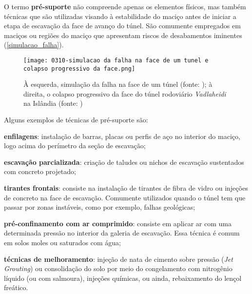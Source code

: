O termo \textbf{pré-suporte} não compreende apenas os elementos físicos, mas também técnicas que são utilizadas visando à estabilidade do maciço antes de iniciar a etapa de escavação da face de avanço do túnel. São comumente empregados em maciços ou regiões do maciço que apresentam riscos de desabamentos iminentes (\autoref{simulacao_falha}).

\begin{figure}[H]
	\begin{center}
		\texttt{[image: 0310-simulacao da falha na face de um tunel e colapso progressivo da face.png]}
	\end{center}
	\caption{\label{simulacao_falha}À esquerda, simulação da falha na face de um túnel (fonte: ); à direita, o colapso progressivo da face do túnel rodoviário \textit{Vadlaheidi} na Islândia (fonte: )}
\end{figure}

Alguns exemplos de técnicas de pré-suporte são:

\begin{alineas}
	
	\item \textbf{enfilagens}: instalação de barras, placas ou perfis de aço no interior do maciço, logo acima do perímetro da seção de escavação;
	
	\item \textbf{escavação parcializada}: criação de taludes ou nichos de escavação sustentados com concreto projetado;
	
	\item \textbf{tirantes frontais}: consiste na instalação de tirantes de fibra de vidro ou injeções de concreto na face de escavação. Comumente utilizados quando o túnel tem que passar por zonas instáveis, como por exemplo, falhas geológicas;
	
	\item \textbf{pré-confinamento com ar comprimido}: consiste em aplicar ar com uma determinada pressão no interior da galeria de escavação. Essa técnica é comum em solos moles ou saturados com água;

	\item \textbf{técnicas de melhoramento}: injeção de nata de cimento sobre pressão (\textit{Jet Grouting}) ou consolidação do solo por meio do congelamento com nitrogênio líquido (ou com salmoura), injeções químicas, ou ainda, rebaixamento do lençol freático.

\end{alineas}

